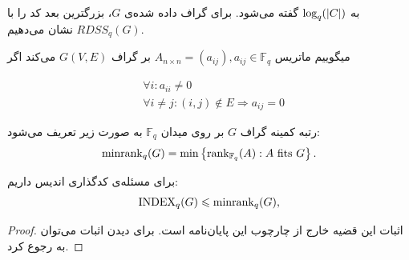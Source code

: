 به
$\log_q(\left|{C}\right|)$
 گفته می‌شود. برای گراف داده شده‌ی $G$، بزرگترین بعد کد را با
 $RDSS_q(G)$
 نشان می‌دهیم.
  \begin{definition}
  	میگوییم ماتریس
  	$A_{n \times n} = (a_{ij}), a_{ij} \in \mathbb{F}_q$
  	بر گراف
  	$G(V, E)$
  	می‌کند اگر 
  	\begin{latin}
  		\begin{align*}
  			& \forall i : a_{ii} \ne 0 \\
  			& \forall i \ne j:  (i, j) \notin E \Rightarrow a_{ij} = 0
  		\end{align*}
  	\end{latin}
  \end{definition}
 \begin{definition}
	 \label{def:minrank}
 	رتبه کمینه گراف
 	$G$
 	بر روی میدان
 	$\mathbb{F}_q$
 	به صورت زیر تعریف می‌شود:
 	\begin{equation}
 		\mathrm{minrank}_q(G) = \min\left\{ \operatorname{rank}_{\mathbb{F}_q}(A): A \text{ fits } G \right\}.
 	\end{equation}
 \end{definition}
 \begin{theorem}
	 \label{thm:minranl}
 برای مسئله‌ی کدگذاری اندیس داریم:
 	\begin{equation}
 		\mathrm{INDEX}_q(G) \leqslant \mathrm{minrank}_q(G),
 		\label{eq:bary}
 	\end{equation} 
 \end{theorem}
 \begin{proof}
 		اثبات این قضیه خارج از چارچوب این پایان‌نامه است. برای دیدن اثبات می‌توان به
 	\cite{4031356}
 	رجوع کرد.
 \end{proof}
